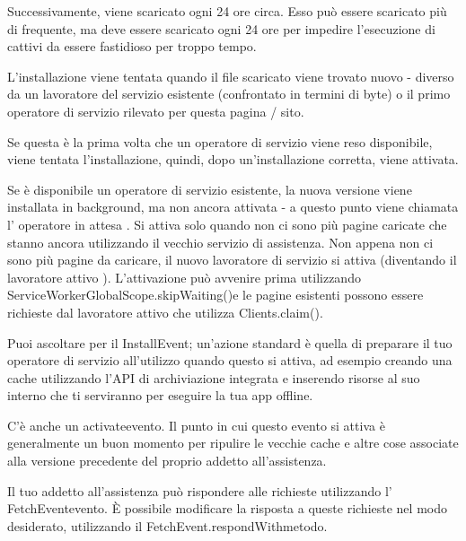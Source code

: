 \documentclass[italian]{article}
\begin{document}
Successivamente, viene scaricato ogni 24 ore circa. Esso può essere scaricato più di frequente, ma deve essere scaricato ogni 24 ore per impedire l'esecuzione di cattivi da essere fastidioso per troppo tempo.

L'installazione viene tentata quando il file scaricato viene trovato nuovo - diverso da un lavoratore del servizio esistente (confrontato in termini di byte) o il primo operatore di servizio rilevato per questa pagina / sito.

Se questa è la prima volta che un operatore di servizio viene reso disponibile, viene tentata l'installazione, quindi, dopo un'installazione corretta, viene attivata.

Se è disponibile un operatore di servizio esistente, la nuova versione viene installata in background, ma non ancora attivata - a questo punto viene chiamata l' operatore in attesa . Si attiva solo quando non ci sono più pagine caricate che stanno ancora utilizzando il vecchio servizio di assistenza. Non appena non ci sono più pagine da caricare, il nuovo lavoratore di servizio si attiva (diventando il lavoratore attivo ). L'attivazione può avvenire prima utilizzando ServiceWorkerGlobalScope.skipWaiting()e le pagine esistenti possono essere richieste dal lavoratore attivo che utilizza Clients.claim().

Puoi ascoltare per il InstallEvent; un'azione standard è quella di preparare il tuo operatore di servizio all'utilizzo quando questo si attiva, ad esempio creando una cache utilizzando l'API di archiviazione integrata e inserendo risorse al suo interno che ti serviranno per eseguire la tua app offline.

C'è anche un activateevento. Il punto in cui questo evento si attiva è generalmente un buon momento per ripulire le vecchie cache e altre cose associate alla versione precedente del proprio addetto all'assistenza.

Il tuo addetto all'assistenza può rispondere alle richieste utilizzando l' FetchEventevento. È possibile modificare la risposta a queste richieste nel modo desiderato, utilizzando il FetchEvent.respondWithmetodo.
\end{document}
